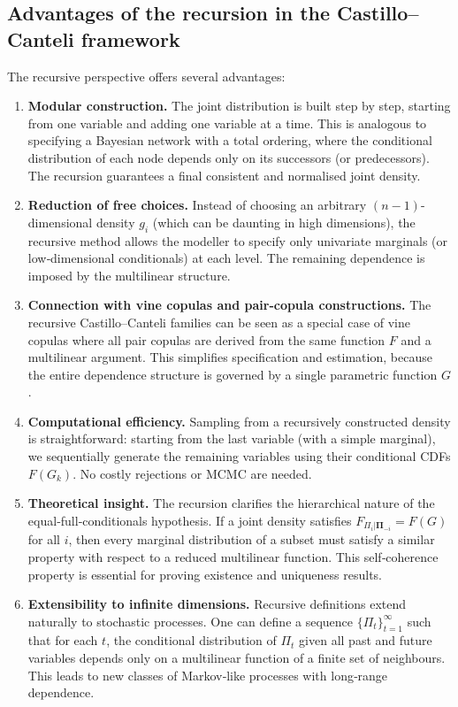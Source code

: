 \subsection{Advantages of the recursion in the Castillo–Canteli framework}

The recursive perspective offers several advantages:

\begin{enumerate}
    \item \textbf{Modular construction.} The joint distribution is built step by step, starting from one variable and adding one variable at a time. This is analogous to specifying a Bayesian network with a total ordering, where the conditional distribution of each node depends only on its successors (or predecessors). The recursion guarantees a final consistent and normalised joint density.

    \item \textbf{Reduction of free choices.} Instead of choosing an arbitrary \((n-1)\)-dimensional density \(g_i\) (which can be daunting in high dimensions), the recursive method allows the modeller to specify only univariate marginals (or low‑dimensional conditionals) at each level. The remaining dependence is imposed by the multilinear structure.

    \item \textbf{Connection with vine copulas and pair‑copula constructions.} The recursive Castillo–Canteli families can be seen as a special case of vine copulas where all pair copulas are derived from the same function \(F\) and a multilinear argument. This simplifies specification and estimation, because the entire dependence structure is governed by a single parametric function \(G\).

    \item \textbf{Computational efficiency.} Sampling from a recursively constructed density is straightforward: starting from the last variable (with a simple marginal), we sequentially generate the remaining variables using their conditional CDFs \(F(G_k)\). No costly rejections or MCMC are needed.

    \item \textbf{Theoretical insight.} The recursion clarifies the hierarchical nature of the equal‑full‑conditionals hypothesis. If a joint density satisfies \(F_{\Pi_i|\boldsymbol{\Pi}_{-i}} = F(G)\) for all \(i\), then every marginal distribution of a subset must satisfy a similar property with respect to a reduced multilinear function. This self‑coherence property is essential for proving existence and uniqueness results.

    \item \textbf{Extensibility to infinite dimensions.} Recursive definitions extend naturally to stochastic processes. One can define a sequence \(\{\Pi_t\}_{t=1}^\infty\) such that for each \(t\), the conditional distribution of \(\Pi_t\) given all past and future variables depends only on a multilinear function of a finite set of neighbours. This leads to new classes of Markov‑like processes with long‑range dependence.
\end{enumerate}

